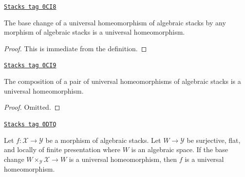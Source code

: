 \begin{lemma}
\label{stacks-morphisms-lemma-base-change-universal-homeomorphism}
\href{https://stacks.math.columbia.edu/tag/0CI8}{\texttt{Stacks tag 0CI8}}

The base change of a universal homeomorphism of algebraic stacks
by any morphism of algebraic stacks is a universal homeomorphism.
\end{lemma}

\begin{proof}
This is immediate from the definition.
\end{proof}

\begin{lemma}
\label{stacks-morphisms-lemma-composition-universal-homeomorphism}
\href{https://stacks.math.columbia.edu/tag/0CI9}{\texttt{Stacks tag 0CI9}}

The composition of a pair of universal homeomorphisms of
algebraic stacks is a universal homeomorphism.
\end{lemma}

\begin{proof}
Omitted.
\end{proof}

\begin{lemma}
\label{stacks-morphisms-lemma-check-universal-homeomorphism-covering}
\href{https://stacks.math.columbia.edu/tag/0DTQ}{\texttt{Stacks tag 0DTQ}}

Let $f : \mathcal{X} \to \mathcal{Y}$ be a morphism of algebraic stacks.
Let $W \to \mathcal{Y}$ be surjective, flat, and locally of finite
presentation where $W$ is an algebraic space. If the base change
$W \times_\mathcal{Y} \mathcal{X} \to W$ is a universal homeomorphism,
then $f$ is a universal homeomorphism.
\end{lemma}

